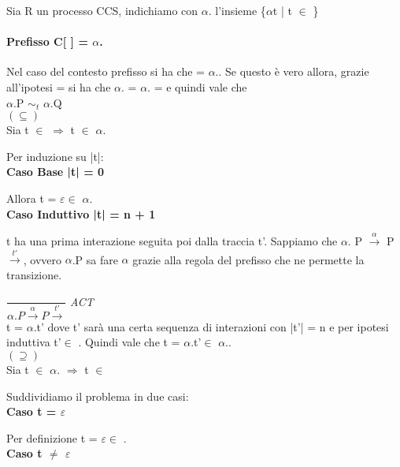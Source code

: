 Sia R un processo CCS, indichiamo con $\alpha$. l'insieme \{$\alpha$t | t $\in$ \}

\paragraph{Prefisso C[ ] = $\alpha$.} \mbox{}

Nel caso del contesto prefisso si ha che  = $\alpha$..
Se questo è vero allora, grazie all'ipotesi  =  si ha che  $\alpha$. =  $\alpha$. =  e quindi vale che\\ $\alpha$.P $\sim_{t}$ $\alpha$.Q\\

$(\subseteq)$ \\

Sia  t $\in$  $\Rightarrow$  t $\in$ $\alpha$.

Per induzione su |t|:
\\

\textbf{Caso Base |t| = 0}

Allora t = $\varepsilon \in$ $ \alpha$.
\\

\textbf{Caso Induttivo |t| = n + 1}

t ha una prima interazione seguita poi dalla traccia t'. Sappiamo che $\alpha.$ P $\overset{\alpha}\rightarrow $ P $\overset{t'}\rightarrow$, ovvero $\alpha$.P sa fare $\alpha$ grazie alla regola del prefisso che ne permette la transizione.

	$\dfrac{}{\alpha.P \overset{\alpha}\rightarrow P\overset{t'}\rightarrow}$ \textit{ACT} \\
	
t = $\alpha$.t' dove t' sarà una certa sequenza di interazioni con |t'| = n e per ipotesi induttiva t'$\in$ . Quindi vale che t = $\alpha$.t'$\in$ $\alpha$..\\

$(\supseteq)$ \\

Sia  t $\in$ $\alpha$. $\Rightarrow$  t $\in$ 

Suddividiamo il problema in due casi:
\\

\textbf{Caso t = $\varepsilon$}

Per definizione t = $\varepsilon \in $ .
\\
 
\textbf{Caso t $\not=$ $\varepsilon$}

